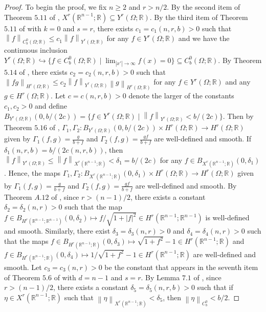 \documentclass[11pt,letterpaper,reqno]{amsart}
\numberwithin{equation}{section}
\newcommand{\abs}[1]{\left\lvert#1\right\rvert}
\newcommand{\norm}[1]{\left\lVert#1\right\rVert}
\begin{document}
\begin{proof}
    To begin the proof, we fix \(n \geq 2\) and \(r> n/2\). By the second item of Theorem \(5.11\) of \cite{leoni2023traveling}, \(X^{r}(\mathbb{R}^{n-1};\mathbb{R}) \subseteq Y^{r}(\Omega;\mathbb{R})\). By the third item of Theorem \(5.11\) of \cite{leoni2023traveling} with \(k=0\) and \(s=r\), there exists \(c_{1}=c_{1}(n,r,b)>0\) such that \(\norm{f}_{C_{b}^{0}(\Omega;\mathbb{R})} \leq c_{1}\norm{f}_{Y^{r}(\Omega;\mathbb{R})}\) for any \(f \in Y^{r}(\Omega;\mathbb{R})\) and we have the continuous inclusion \(Y^{r}(\Omega;\mathbb{R}) \hookrightarrow \{f \in C_{b}^{0}(\Omega;\mathbb{R}) \mid \lim_{\abs{x'} \to \infty}f(x)=0 \} \subseteq C_{b}^{0}(\Omega;\mathbb{R})\). By Theorem \(5.14\) of \cite{leoni2023traveling}, there exists \(c_{2}=c_{2}(n,r,b)>0\) such that \(\norm{fg}_{H^{r}(\Omega;\mathbb{R})} \leq c_{2}\norm{f}_{Y^{r}(\Omega;\mathbb{R})}\norm{g}_{H^{r}(\Omega;\mathbb{R})}\) for any \(f \in Y^{r}(\Omega;\mathbb{R})\) and any \(g \in H^{r}(\Omega;\mathbb{R})\). Let \(c=c(n,r,b)>0\) denote the larger of the constants \(c_{1},c_{2}>0\) and define \(B_{Y^{r}(\Omega;\mathbb{R})}(0,b/(2c))=\{f \in Y^{r}(\Omega;\mathbb{R})\mid \norm{f}_{Y^{r}(\Omega;\mathbb{R})}<b/(2c)\}\). Then by Theorem \(5.16\) of \cite{leoni2023traveling}, \(\Gamma_{1}, \Gamma_{2}:B_{Y^{r}(\Omega;\mathbb{R})}(0,b/(2c)) \times H^{r}(\Omega;\mathbb{R}) \to H^{r}(\Omega;\mathbb{R})\) given by \(\Gamma_{1}(f,g)=\frac{g}{b+f}\) and \(\Gamma_{2}(f,g)=\frac{gf}{b+f}\) are well-defined and smooth. If \(\delta_{1}(n,r,b) = b/(2c(n,r,b))\), then \(\norm{f}_{Y^{r}(\Omega;\mathbb{R})} \leq \norm{f}_{X^{r}(\mathbb{R}^{n-1};\mathbb{R})} < \delta_{1} = b/(2c)\) for any \(f \in B_{X^{r}(\mathbb{R}^{n-1};\mathbb{R})}(0,\delta_{1})\). Hence, the maps \(\Gamma_{1}, \Gamma_{2}: B_{X^{r}(\mathbb{R}^{n-1};\mathbb{R})}(0,\delta_{1}) \times H^{r}(\Omega;\mathbb{R}) \to H^{r}(\Omega;\mathbb{R})\) given by \(\Gamma_{1}(f,g)=\frac{g}{b+f}\) and \(\Gamma_{2}(f,g)=\frac{g f}{b+f}\) are well-defined and smooth. By Theorem \(A.12\) of \cite{leoni2023traveling}, since \(r > (n-1)/2\), there exists a constant \(\delta_{2}=\delta_{2}(n,r)>0\) such that the map \(f \in B_{H^{r}(\mathbb{R}^{n-1};\mathbb{R}^{n-1})}(0,\delta_{2}) \mapsto f/\sqrt{1+\abs{f}^{2}} \in H^{r}(\mathbb{R}^{n-1};\mathbb{R}^{n-1})\) is well-defined and smooth. Similarly, there exist \(\delta_{3}=\delta_{3}(n,r)>0\) and \(\delta_{4}=\delta_{4}(n,r)>0\) such that the maps \(f \in B_{H^{r}(\mathbb{R}^{n-1};\mathbb{R})}(0,\delta_{3}) \mapsto \sqrt{1+f^{2}}-1\in H^{r}(\mathbb{R}^{n-1};\mathbb{R})\) and \(f\in B_{H^{r}(\mathbb{R}^{n-1};\mathbb{R})}(0,\delta_{4}) \mapsto 1/\sqrt{1+f^{2}}-1 \in H^{r}(\mathbb{R}^{n-1};\mathbb{R})\) are well-defined and smooth. Let \(c_{3}=c_{3}(n,r)>0\) be the constant that appears in the seventh item of Theorem \(5.6\) of \cite{leoni2023traveling} with \(d=n-1\) and \(s=r\). By Lemma \(7.1\) of \cite{leoni2023traveling}, since \(r>(n-1)/2\), there exists a constant \(\delta_{5}=\delta_{5}(n,r,b)>0\) such that if \(\eta \in X^{r}(\mathbb{R}^{n-1};\mathbb{R})\) such that \(\norm{\eta}_{X^{r}(\mathbb{R}^{n-1};\mathbb{R})}<\delta_{5}\), then \(\norm{\eta}_{C_{b}^{0}}<b/2\).


\end{proof}
\end{document}
